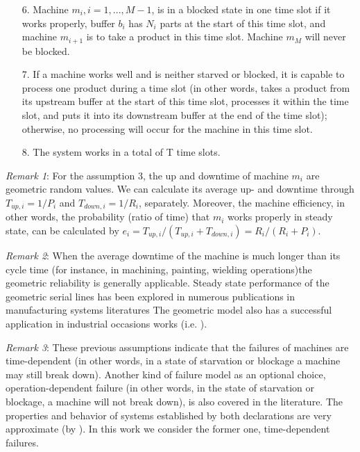 \begin{itemize}
    \item[6.] Machine $m_i,i = 1,...,M-1$, is in a blocked state in one time slot if it works properly, buffer $b_i$ has $N_i$ parts at the start of this time slot, and machine $m_{i+1}$ is  to take a product in this time slot. Machine $m_M$ will never be blocked.
    \item[7.] If a machine works well and is neither starved or blocked, it is capable to process one product during a time slot (in other words, takes a product from its upstream buffer at the start of this time slot, processes it within the time slot, and puts it into its downstream buffer at the end of the time slot); otherwise, no processing will occur for the machine in this time slot.
    \item[8.] The system works in a total of T time slots.
\end{itemize}

\textsl{Remark 1}: For the assumption 3, the up and downtime of machine $m_i$ are geometric random values. We can calculate its average up- and downtime through $T_{up,i}=1 / P_i$ and $T_{down,i} = 1/ R_i$, separately. Moreover, the machine efficiency, in other words, the probability (ratio of time) that $m_i$ works properly in steady state, can be calculated by $e_i=T_{up,i}/(T_{up,i}+T_{down,i}) = R_i/(R_i + P_i)$.

\textsl{Remark 2}: When the average downtime of the machine is much longer than its cycle time (for instance, in machining, painting, wielding operations)the geometric reliability is generally applicable. Steady state performance of the geometric serial lines has been explored in numerous publications in manufacturing systems literatures \cite{papadopolous1993queueing,buzacott1993stochastic, gershwin1994manufacturing,altiok1997performance} The geometric model also has a successful application in industrial occasions works (i.e. \cite{li2003due, liberopoulos2007performance}).

\textsl{Remark 3}: These previous assumptions indicate that the failures of machines are time-dependent (in other words, in a state of starvation or blockage a machine may still break down). Another kind of failure model as an optional choice, operation-dependent failure (in other words, in the state of starvation or blockage, a machine will not break down), is also covered in the literature. The properties and behavior of systems established by both declarations are very approximate (by \cite{li2006comparisons}). In this work we consider the former one, time-dependent failures.


